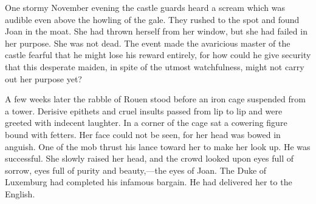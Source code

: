 One stormy November evening the castle guards heard a scream which was
audible even above the howling of the gale. They rushed to the spot and
found Joan in the moat. She had thrown herself from her window, but she
had failed in her purpose. She was not dead. The event made the
avaricious master of the castle fearful that he might lose his reward
entirely, for how could he give security that this desperate maiden, in
spite of the utmost watchfulness, might not carry out her purpose yet?

A few weeks later the rabble of Rouen stood before an iron cage
suspended from a tower. Derisive epithets and cruel insults passed from
lip to lip and were greeted with indecent laughter. In a corner of the
cage sat a cowering figure bound with fetters. Her face could not be
seen, for her head was bowed in anguish. One of the mob thrust his lance
toward her to make her look up. He was successful. She slowly raised her
head, and the crowd looked upon eyes full of sorrow, eyes full of purity
and beauty,---the eyes of Joan. The Duke of Luxemburg had completed his
infamous bargain. He had delivered her to the English.

\threeast
